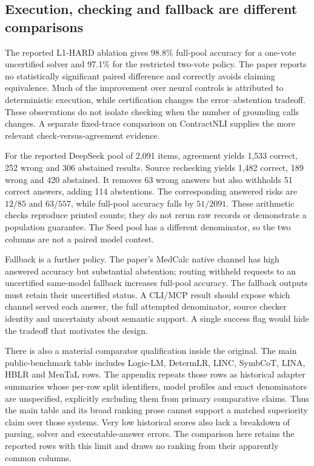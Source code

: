 \subsection{Execution, checking and fallback are different comparisons}
\label{exec23:controlled-writes-results}
The reported L1-HARD ablation gives 98.8\% full-pool accuracy for a one-vote
uncertified solver and 97.1\% for the restricted two-vote policy. The paper
reports no statistically significant paired difference and correctly avoids
claiming equivalence. Much of the improvement over neural controls is
attributed to deterministic execution, while certification changes the
error--abstention tradeoff. These observations do not isolate checking when
the number of grounding calls changes. A separate fixed-trace comparison
on ContractNLI supplies the more relevant check-versus-agreement evidence.
\citep{exec23_controlled_writes_paper}

For the reported DeepSeek pool of 2,091 items, agreement yields
1,533 correct, 252 wrong and 306 abstained results. Source rechecking yields
1,482 correct, 189 wrong and 420 abstained. It removes 63 wrong answers but
also withholds 51 correct answers, adding 114 abstentions. The corresponding
answered risks are $12/85$ and $63/557$, while full-pool accuracy falls by
$51/2091$. These arithmetic checks reproduce printed counts; they do not
rerun raw records or demonstrate a population guarantee. The Seed pool has
a different denominator, so the two columns are not a paired model contest.
\citep{exec23_controlled_writes_paper,exec23_controlled_writes_reference}

Fallback is a further policy. The paper's MedCalc native channel has high
answered accuracy but substantial abstention; routing withheld requests to
an uncertified same-model fallback increases full-pool accuracy. The fallback
outputs must retain their uncertified status. A CLI/MCP result should expose
which channel served each answer, the full attempted denominator, source
checker identity and uncertainty about semantic support. A single success
flag would hide the tradeoff that motivates the design.
\citep{exec23_controlled_writes_paper}

There is also a material comparator qualification inside the original.
The main public-benchmark table includes Logic-LM, DetermLR, LINC, SymbCoT,
LINA, HBLR and MenTaL rows. The appendix repeats those rows as historical
adapter summaries whose per-row split identifiers, model profiles and exact
denominators are unspecified, explicitly excluding them from primary
comparative claims. Thus the main table and its broad ranking prose cannot
support a matched superiority claim over those systems. Very low historical
scores also lack a breakdown of parsing, solver and executable-answer errors.
The comparison here retains the reported rows with this limit and draws no
ranking from their apparently common columns.
\citep{exec23_controlled_writes_paper}

